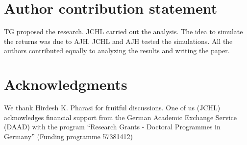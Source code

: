 \section{Author contribution statement}

TG proposed the research. JCHL carried out the analysis. The idea to simulate
the returns was due to AJH. JCHL and AJH tested the simulations. All the
authors contributed equally to analyzing the results and writing the paper.

\section*{Acknowledgments}

We thank Hirdesh K. Pharasi for fruitful discussions. One of us (JCHL)
acknowledges financial support from the German Academic Exchange Service
(DAAD) with the program ``Research Grants - Doctoral Programmes in Germany''
(Funding programme 57381412)


